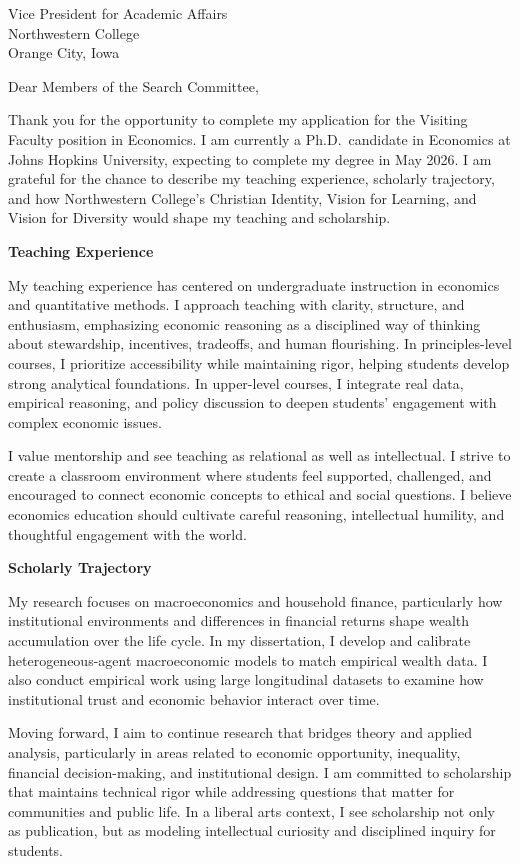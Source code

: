 \documentclass[11pt,letterpaper]{letter}
\begin{document}
\begin{letter}{
Vice President for Academic Affairs \\
Northwestern College \\
Orange City, Iowa
}

\opening{Dear Members of the Search Committee,}

Thank you for the opportunity to complete my application for the Visiting Faculty position in Economics. I am currently a Ph.D.\ candidate in Economics at Johns Hopkins University, expecting to complete my degree in May 2026. I am grateful for the chance to describe my teaching experience, scholarly trajectory, and how Northwestern College’s Christian Identity, Vision for Learning, and Vision for Diversity would shape my teaching and scholarship.

\textbf{Teaching Experience}

My teaching experience has centered on undergraduate instruction in economics and quantitative methods. I approach teaching with clarity, structure, and enthusiasm, emphasizing economic reasoning as a disciplined way of thinking about stewardship, incentives, tradeoffs, and human flourishing. In principles-level courses, I prioritize accessibility while maintaining rigor, helping students develop strong analytical foundations. In upper-level courses, I integrate real data, empirical reasoning, and policy discussion to deepen students’ engagement with complex economic issues.

I value mentorship and see teaching as relational as well as intellectual. I strive to create a classroom environment where students feel supported, challenged, and encouraged to connect economic concepts to ethical and social questions. I believe economics education should cultivate careful reasoning, intellectual humility, and thoughtful engagement with the world.

\textbf{Scholarly Trajectory}

My research focuses on macroeconomics and household finance, particularly how institutional environments and differences in financial returns shape wealth accumulation over the life cycle. In my dissertation, I develop and calibrate heterogeneous-agent macroeconomic models to match empirical wealth data. I also conduct empirical work using large longitudinal datasets to examine how institutional trust and economic behavior interact over time.

Moving forward, I aim to continue research that bridges theory and applied analysis, particularly in areas related to economic opportunity, inequality, financial decision-making, and institutional design. I am committed to scholarship that maintains technical rigor while addressing questions that matter for communities and public life. In a liberal arts context, I see scholarship not only as publication, but as modeling intellectual curiosity and disciplined inquiry for students.


\end{letter}
\end{document}
